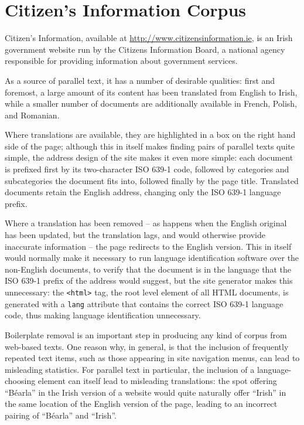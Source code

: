 \chapter{Citizen's Information Corpus}
\label{app:citinfcorpus}

Citizen's Information, available at \href{http://www.citizensinformation.ie}{http://www.citizensinformation.ie}, 
is an Irish government website run by the Citizens Information Board, a national agency responsible for
providing information about government services. 

As a source of parallel text, it has a number of desirable qualities: first and foremost, a large amount of its
content has been translated from English to Irish, while a smaller number of documents are additionally 
available in French, Polish, and Romanian.

Where translations are available, they are highlighted in a box on the right hand side of the page; although
this in itself makes finding pairs of parallel texts quite simple, the address design of the site makes it
even more simple: each document is prefixed first by its two-character ISO 639-1 code, followed by categories
and subcategories the document fits into, followed finally by the page title. Translated documents retain the
English address, changing only the ISO 639-1 language prefix.

Where a translation has been removed -- as happens when the English original has been updated, but the translation
lags, and would otherwise provide inaccurate information -- the page redirects to the English version. This in
itself would normally make it necessary to run language identification software over the non-English documents, to
verify that the document is in the language that the ISO 639-1 prefix of the address would suggest, but the site
generator makes this unnecessary: the \texttt{<html>} tag, the root level element of all HTML documents, is
generated with a \texttt{lang} attribute that contains the correct ISO 639-1 language code, thus making language 
identification unnecessary.

Boilerplate removal is an important step in producing any kind of corpus from web-based texts. One reason why,
in general, is that the inclusion of frequently repeated text items, such as those appearing in site 
navigation menus, can lead to misleading statistics. For parallel text in particular, the inclusion of a
language-choosing element can itself lead to misleading translations: the spot offering ``B\'earla'' in the
Irish version of a website would quite naturally offer ``Irish'' in the same location of the English version
of the page, leading to an incorrect pairing of ``B\'earla'' and ``Irish''.

